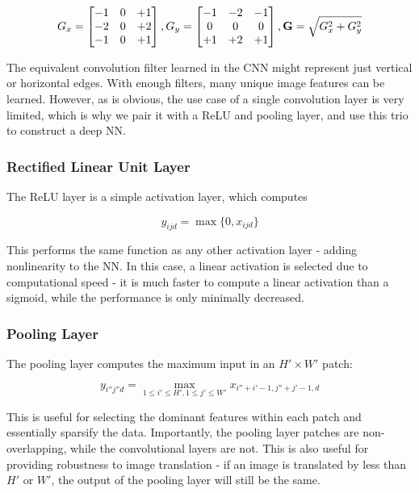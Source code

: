 \documentclass[11pt]{article}
\begin{document}
\[
G_x =
\begin{bmatrix}
    -1       & 0 & +1 \\
    -2       & 0 & +2 \\
    -1       & 0 & +1
\end{bmatrix},
G_y = 
\begin{bmatrix}
    -1       & -2 & -1 \\
    0       & 0 & 0 \\
    +1       & +2 & +1
\end{bmatrix}
\\,
\mathbf{G} = \sqrt{G_x^2 + G_y^2}
\]

The equivalent convolution filter learned in the CNN might represent just vertical or horizontal edges. With enough filters, many unique image features can be learned. However, as is obvious, the use case of a single convolution layer is very limited, which is why we pair it with a ReLU and pooling layer, and use this trio to construct a deep NN.

\subsubsection{Rectified Linear Unit Layer}
The ReLU layer is a simple activation layer, which computes

\[ y_{ijd} = \max\{0,x_{ijd}\} \]

This performs the same function as any other activation layer - adding nonlinearity to the NN. In this case, a linear activation is selected due to computational speed - it is much faster to compute a linear activation than a sigmoid, while the performance is only minimally decreased.

\subsubsection{Pooling Layer}
The pooling layer computes the maximum input in an $H' \times W'$ patch:

\[ y_{i''j''d} = \max_{1\le i' \le H',1\le j' \le W'} x_{i''+i'-1,j''+j'-1,d} \]

This is useful for selecting the dominant features within each patch and essentially sparsify the data. Importantly, the pooling layer patches are non-overlapping, while the convolutional layers are not. This is also useful for providing robustness to image translation - if an image is translated by less than $H'$ or $W'$, the output of the pooling layer will still be the same.
\end{document}
